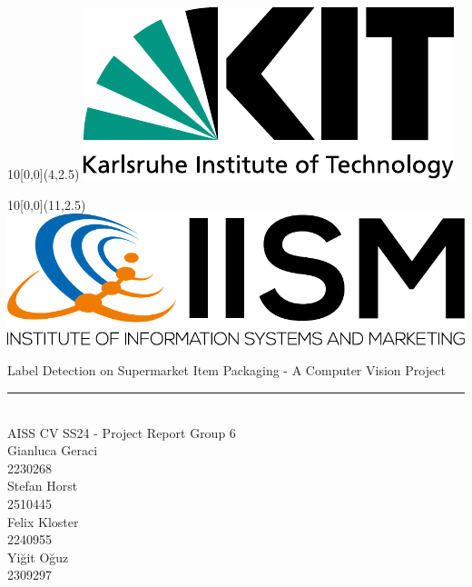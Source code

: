
\newcommand{\diameter}{20}
\newcommand{\xone}{-15}
\newcommand{\xtwo}{160}
\newcommand{\yone}{15}
\newcommand{\ytwo}{-253}

\begin{titlepage}
	\begin{textblock}{10}[0,0](4,2.5)
		\includegraphics[width=.3\textwidth]{logos/KITLogo_EN_RGB.pdf}
	\end{textblock}
	\begin{textblock}{10}[0,0](11,2.5)
		\includegraphics[width=.48\textwidth]{logos/IISMLogo_RGB.pdf}	\end{textblock}
	\vspace*{3.5cm}
	\begin{center}
		\Huge{Label Detection on Supermarket Item Packaging - A Computer Vision Project}\\
		\rule{0.05\textwidth}{0.5pt}\\
		\Large{
			AISS CV SS24 - Project Report Group 6
		}\\
		\vspace*{1cm}
		\Large{Gianluca Geraci}\\
			\Large{2230268}\\
      \Large{Stefan Horst}\\
			\Large{2510445}\\
       \Large{Felix Kloster}\\
			\Large{2240955}\\
        \Large{Yi\u{g}it O\u{g}uz}\\
			\Large{2309297}\\

\end{center}
\end{titlepage}
